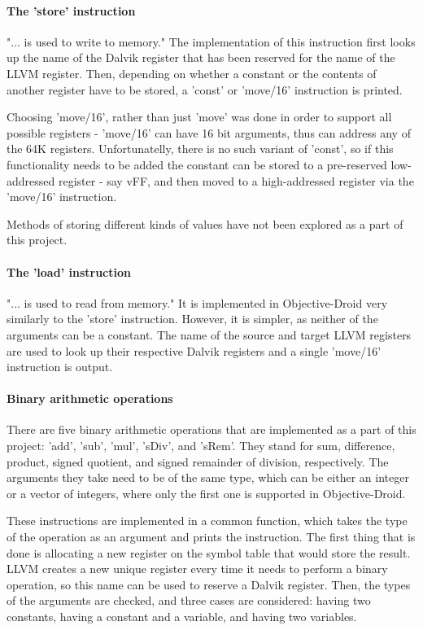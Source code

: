 \documentclass[parskip]{cs4rep}
\begin{document}
\paragraph{The 'store' instruction} "... is used to write to memory."\cite{P11} The implementation of this instruction first looks up the name of the Dalvik register that has been reserved for the name of the LLVM register. Then, depending on whether a constant or the contents of another register have to be stored, a 'const' or 'move/16' instruction is printed.

Choosing 'move/16', rather than just 'move' was done in order to support all possible registers - 'move/16' can have 16 bit arguments, thus can address any of the 64K registers. Unfortunatelly, there is no such variant of 'const', so if this functionality needs to be added the constant can be stored to a pre-reserved low-addressed register - say vFF, and then moved to a high-addressed register via the 'move/16' instruction.

Methods of storing different kinds of values have not been explored as a part of this project.

\paragraph{The 'load' instruction} "... is used to read from memory."\cite{P11} It is implemented in Objective-Droid very similarly to the 'store' instruction. However, it is simpler, as neither of the arguments can be a constant. The name of the source and target LLVM registers are used to look up their respective Dalvik registers and a single 'move/16' instruction is output.

\paragraph{Binary arithmetic operations} There are five binary arithmetic operations that are implemented as a part of this project: 'add', 'sub', 'mul', 'sDiv', and 'sRem'. They stand for sum, difference, product, signed quotient, and signed remainder of division, respectively. The arguments they take need to be of the same type, which can be either an integer or a vector of integers, where only the first one is supported in Objective-Droid.

These instructions are implemented in a common function, which takes the type of the operation as an argument and prints the instruction. The first thing that is done is allocating a new register on the symbol table that would store the result. LLVM creates a new unique register every time it needs to perform a binary operation, so this name can be used to reserve a Dalvik register. Then, the types of the arguments are checked, and three cases are considered: having two constants, having a constant and a variable, and having two variables.
\end{document}

